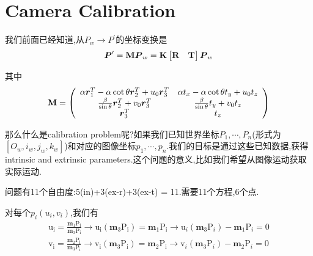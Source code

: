 \section{Camera Calibration}
我们前面已经知道,从$P_w \to P^\prime$的坐标变换是
\begin{equation}
	\boldsymbol P^\prime = \bold{M} \boldsymbol P_w = \bold{K}
	\begin{bmatrix}
		\bold{R} & \bold{T}
	\end{bmatrix} \boldsymbol P_w
\end{equation}

其中
\begin{equation}
	\bold{M}=\left(\begin{array}{cc}
		\alpha \boldsymbol{r}_{1}^{T}-\alpha \cot \theta \boldsymbol{r}_{2}^{T}+u_{0} \boldsymbol{r}_{3}^{T} & \alpha t_{x}-\alpha \cot \theta t_{y}+u_{0} t_{z} \\
		\frac{\beta}{\sin \theta} \boldsymbol{r}_{2}^{T}+v_{0} \boldsymbol{r}_{3}^{T} & \frac{\beta}{\sin \theta} t_{y}+v_{0} t_{z} \\
		\boldsymbol{r}_{3}^{T} & t_{z}
	\end{array}\right)
\end{equation}

那么什么是calibration problem呢?如果我们已知世界坐标$P_1, \cdots, P_n$(形式为$[O_w, i_w, j_w, k_w]$)和对应的图像坐标$p_1,\cdots, p_n$.我们的目标是通过这些已知数据,获得intrinsic and extrinsic parameters.这个问题的意义,比如我们希望从图像运动获取实际运动.

问题有11个自由度:5(in)+3(ex-r)+3(ex-t) = 11.需要11个方程,6个点.

对每个$p_i(u_i, v_i)$,我们有
\begin{equation}
	\begin{array}{l}
		\mathrm{u}_{\mathrm{i}}=\frac{\mathbf{m}_{1} \mathrm{P}_{\mathrm{i}}}{\mathbf{m}_{3} \mathrm{P}_{\mathrm{i}}} \rightarrow \mathrm{u}_{\mathrm{i}}\left(\mathbf{m}_{3} \mathrm{P}_{\mathrm{i}}\right)=\mathbf{m}_{1} \mathrm{P}_{\mathrm{i}} \rightarrow \mathrm{u}_{i}\left(\mathbf{m}_{3} \mathrm{P}_{i}\right)-\mathbf{m}_{1} \mathrm{P}_{i}=0 \\
		\mathrm{v}_{\mathrm{i}}=\frac{\mathbf{m}_{2} \mathrm{P}_{\mathrm{i}}}{\mathbf{m}_{3} \mathrm{P}_{\mathrm{i}}} \rightarrow \mathrm{v}_{\mathrm{i}}\left(\mathbf{m}_{3} \mathrm{P}_{\mathrm{i}}\right)=\mathbf{m}_{2} \mathrm{P}_{\mathrm{i}} \rightarrow \mathrm{v}_{i}\left(\mathbf{m}_{3} \mathrm{P}_{i}\right)-\mathbf{m}_{2} \mathrm{P}_{i}=0
	\end{array}
\end{equation}

